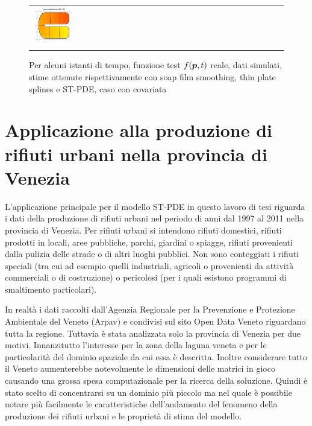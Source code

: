 \documentclass[a4paper,11pt,twoside,openright]{book}							%
\begin{document}
\begin{landscape}
\begin{figure}
\begin{tabular}{lccccc}
\includegraphics[trim=0cm 0cm 0cm 1.8cm,clip=true,width=0.19\textwidth,valign=t]{Immagini/simulazioni_covar/STSRtempo4.png}
\end{tabular}
\caption{Per alcuni istanti di tempo, funzione test $f(\protect\bm{p},t)$ reale, dati simulati, stime ottenute rispettivamente con soap film smoothing, thin plate splines e ST-PDE, caso con covariata}
\label{fig:confronto_altri_metodi_cov}
\end{figure}
\end{landscape}


\chapter{Applicazione alla produzione di rifiuti urbani nella provincia di Venezia}
\label{cap:rifiuti}

L'applicazione principale per il modello ST-PDE in questo lavoro di tesi riguarda i dati della produzione di rifiuti urbani nel periodo di anni dal 1997 al 2011 nella provincia di Venezia. Per rifiuti urbani si intendono rifiuti domestici, rifiuti prodotti in locali, aree pubbliche, parchi, giardini o spiagge, rifiuti provenienti dalla pulizia delle strade o di altri luoghi pubblici. Non sono conteggiati i rifiuti speciali (tra cui ad esempio quelli industriali, agricoli o provenienti da attività commerciali o di costruzione) o pericolosi (per i quali esistono programmi di smaltimento particolari).

In realtà i dati raccolti dall'Agenzia Regionale per la Prevenzione e Protezione Ambientale del Veneto (Arpav) e condivisi sul sito Open Data Veneto riguardano tutta la regione. Tuttavia è stata analizzata solo la provincia di Venezia per due motivi. Innanzitutto l'interesse per la zona della laguna veneta e per le particolarità del dominio spaziale da cui essa è descritta. Inoltre considerare tutto il Veneto aumenterebbe notevolmente le dimensioni delle matrici in gioco causando una grossa spesa computazionale per la ricerca della soluzione. Quindi è stato scelto di concentrarsi su un dominio più piccolo ma nel quale è possibile notare più facilmente le caratteristiche dell'andamento del fenomeno della produzione dei rifiuti urbani e le proprietà di stima del modello.
\end{document}
